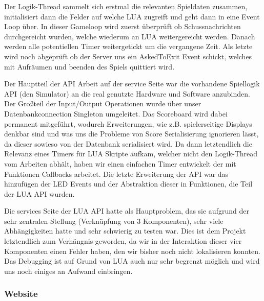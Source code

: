 Der Logik-Thread sammelt sich erstmal die relevanten Spieldaten zusammen, initialisiert dann die Felder auf welche LUA zugreift und geht dann in eine Event Loop über. In dieser Gameloop wird zuerst überprüft ob Schussnachrichten durchgereicht wurden, welche wiederum an LUA weitergereicht werden. Danach werden alle potentiellen Timer weitergetickt um die vergangene Zeit. Als letzte wird noch abgeprüft ob der Server uns ein AskedToExit Event schickt, welches mit Aufräumen und beenden des Spiels quittiert wird.

Der Hauptteil der API Arbeit auf der service Seite war die vorhandene Spiellogik API (den Simulator) an die real genutzte Hardware und Software anzubinden. Der Großteil der Input/Output Operationen wurde über unser Datenbankconnection Singleton umgeleitet. Das Scoreboard wird dabei permanent mitgeführt, wodurch Erweiterungen, wie z.B. spielerseitige Displays denkbar sind und was uns die Probleme von Score Serialisierung ignorieren lässt, da dieser sowieso von der Datenbank serialisiert wird. Da dann letztendlich die Relevanz eines Timers für LUA Skripte aufkam, welcher nicht den Logik-Thread vom Arbeiten abhält, haben wir einen einfachen Timer entwickelt der mit Funktionen Callbacks arbeitet. Die letzte Erweiterung der API war das hinzufügen der LED Events und der Abstraktion dieser in Funktionen, die Teil der LUA API wurden.

Die services Seite der LUA API hatte als Hauptproblem, das sie aufgrund der sehr zentralen Stellung (Verknüpfung von 3 Komponenten), sehr viele Abhängigkeiten hatte und sehr schwierig zu testen war. Dies ist dem Projekt letztendlich zum Verhängnis geworden, da wir in der Interaktion dieser vier Komponenten einen Fehler haben, den wir bisher noch nicht lokalisieren konnten. Das Debugging ist auf Grund von LUA auch nur sehr begrenzt möglich und wird uns noch einiges an Aufwand einbringen.
\subsubsection{Website}

